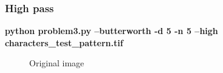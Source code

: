         \pagebreak
        \subsubsection{High pass}

        \small{\textbf{python problem3.py --butterworth -d 5 -n 5 --high characters\_test\_pattern.tif}}

        \begin{figure}[!htb]\centering
            \begin{minipage}{0.40\textwidth}
                \caption{\small{Original image}}
            \end{minipage}
            \begin{minipage}{0.40\textwidth}

\end{minipage}
\end{figure}
